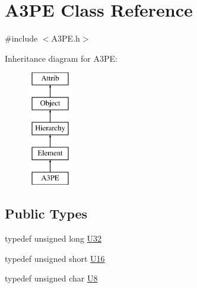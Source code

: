 \hypertarget{classA3PE}{}\section{A3\+PE Class Reference}
\label{classA3PE}


{\ttfamily \#include $<$A3\+P\+E.\+h$>$}

Inheritance diagram for A3\+PE\+:\begin{figure}[H]
\begin{center}
\leavevmode
\includegraphics[height=5.000000cm]{classA3PE}
\end{center}
\end{figure}
\subsection*{Public Types}
\begin{DoxyCompactItemize}
\item 
typedef unsigned long \hyperlink{classA3PE_af2773f4a4f8e9940b1e008386c4e908c}{U32}
\item 
typedef unsigned short \hyperlink{classA3PE_a2ee28b2899c3cc4f22821b4138758c28}{U16}
\item 
typedef unsigned char \hyperlink{classA3PE_ab70116c2810a9a01142a33c69fdda039}{U8}
\end{DoxyCompactItemize}
